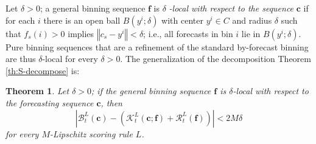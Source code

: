 \documentclass[12pt,a4paper,notitlepage]{article}
\newtheorem{theorem}{Theorem}
\begin{document}
Let $\delta >0$; a general binning sequence $\mathbf{f}$ is $\delta $\emph{%
-local with respect to the sequence }$\mathbf{c}$ if for each $i$ there is
an open ball $B(y^{i};\delta )$ with center $y^{i}\in C$ and radius $\delta $
such that $f_{s}(i)>0$ implies $\left\Vert c_{s}-y^{i}\right\Vert <\delta $;
i.e., all forecasts in bin $i$ lie in $B(y^{i};\delta ).$ Pure binning
sequences that are a refinement of the standard by-forecast binning are thus 
$\delta $-local for every $\delta >0$. The generalization of the
decomposition Theorem \ref{th:S-decompose} is:

\begin{theorem}
\label{th:decompose-delta}Let $\delta >0$; if the general binning sequence $%
\mathbf{f}$ is $\delta $-local with respect to the forecasting sequence $%
\mathbf{c}$, then%
\begin{equation*}
\left\vert \mathcal{B}_{t}^{L}(\mathbf{c})-\left( \mathcal{K}_{t}^{L}(%
\mathbf{c};\mathbf{f})+\mathcal{R}_{t}^{L}(\mathbf{f})\right) \right\vert
<2M\delta
\end{equation*}%
for every $M$-Lipschitz scoring rule $L$.
\end{theorem}
\end{document}
